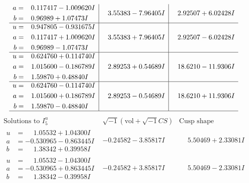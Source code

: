 \documentclass[1p]{elsarticle_modified}
\theoremstyle{definition}
\newcommand{\I}{\sqrt{-1}}
\begin{document}
$$\begin{array}{c|c|c}
\begin{aligned}
a &= \phantom{-}0.117417 - 1.009620 I \\
b &= \phantom{-}0.96989 + 1.07473 I\end{aligned}
 & \phantom{-}3.55383 - 7.96405 I & \phantom{-}2.92507 + 6.02428 I \\ \hline\begin{aligned}
u &= \phantom{-}0.947805 - 0.931675 I \\
a &= \phantom{-}0.117417 + 1.009620 I \\
b &= \phantom{-}0.96989 - 1.07473 I\end{aligned}
 & \phantom{-}3.55383 + 7.96405 I & \phantom{-}2.92507 - 6.02428 I \\ \hline\begin{aligned}
u &= \phantom{-}0.624760 + 0.114740 I \\
a &= \phantom{-}1.015600 - 0.186789 I \\
b &= \phantom{-}1.59870 + 0.48840 I\end{aligned}
 & \phantom{-}2.89253 + 0.54689 I & \phantom{-}18.6210 - 11.9306 I \\ \hline\begin{aligned}
u &= \phantom{-}0.624760 - 0.114740 I \\
a &= \phantom{-}1.015600 + 0.186789 I \\
b &= \phantom{-}1.59870 - 0.48840 I\end{aligned}
 & \phantom{-}2.89253 - 0.54689 I & \phantom{-}18.6210 + 11.9306 I\\
 \hline 
 \end{array}$$\newpage$$\begin{array}{c|c|c}  
\text{Solutions to }I^u_{5}& \I (\text{vol} + \sqrt{-1}CS) & \text{Cusp shape}\\
 \hline 
\begin{aligned}
u &= \phantom{-}1.05532 + 1.04300 I \\
a &= -0.530965 - 0.863445 I \\
b &= \phantom{-}1.38342 + 0.39958 I\end{aligned}
 & -0.24582 - 3.85817 I & \phantom{-}5.50469 + 2.33081 I \\ \hline\begin{aligned}
u &= \phantom{-}1.05532 - 1.04300 I \\
a &= -0.530965 + 0.863445 I \\
b &= \phantom{-}1.38342 - 0.39958 I\end{aligned}
 & -0.24582 + 3.85817 I & \phantom{-}5.50469 - 2.33081 I \\ \hline\begin{aligned}

\end{aligned}
\end{array}$$
\end{document}
